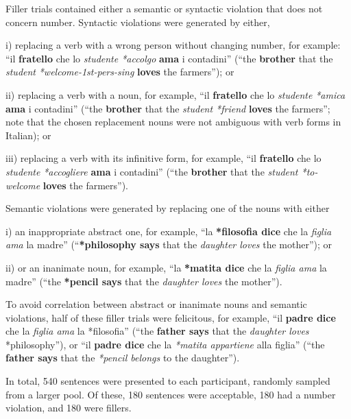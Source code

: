 Filler trials contained either a semantic or syntactic violation that does not concern number. 
Syntactic violations were generated by either, \begin{APAitemize}\setlength\itemsep{0mm}
\item [i)] replacing a verb with a wrong person without changing number, for example: ``il \textbf{fratello} che lo \emph{studente *accolgo} \textbf{ama} i contadini'' (``the \textbf{brother} that the \emph{student} \emph{*welcome-1st-pers-sing} \textbf{loves} the farmers''); or
\item[ii)] replacing a verb with a noun, for example, ``il \textbf{fratello} che lo \emph{studente} \emph{*amica} \textbf{ama} i contadini'' (``the \textbf{brother} that the \emph{student *friend} \textbf{loves} the farmers''; note that the chosen replacement nouns were not ambiguous with verb forms in Italian); or 
\item[iii)] replacing a verb with its infinitive form, for example, ``il \textbf{fratello} che lo \emph{studente} \emph{*accogliere} \textbf{ama} i contadini'' (``the \textbf{brother} that the \emph{student *to-welcome} \textbf{loves} the farmers''). 
\end{APAitemize}
Semantic violations were generated by replacing one of the nouns with either\begin{APAitemize}\setlength\itemsep{0mm}
\item[i)] an inappropriate abstract one, for example, ``la \textbf{*filosofia dice} che la \emph{figlia ama} la madre'' (``\textbf{*philosophy says} that the \emph{daughter loves} the mother''); or
\item[ii)] or an inanimate noun, for example, ``la \textbf{*matita dice} che la \emph{figlia ama} la madre'' (``the \textbf{*pencil says} that the \emph{daughter loves} the mother''). 
\end{APAitemize}

To avoid correlation between abstract or inanimate nouns and semantic violations, half of these filler trials were felicitous, for example, ``il \textbf{padre dice} che la \emph{figlia ama} la *filosofia'' (``the \textbf{father says} that the \emph{daughter loves} *philosophy''), or ``il \textbf{padre dice} che la \emph{*matita appartiene} alla figlia'' (``the \textbf{father says} that the \emph{*pencil belongs} to the daughter'').

In total, 540 sentences were presented to each participant, randomly sampled from a larger pool. Of these, 180 sentences were acceptable, 180 had a number violation, and 180 were fillers.

